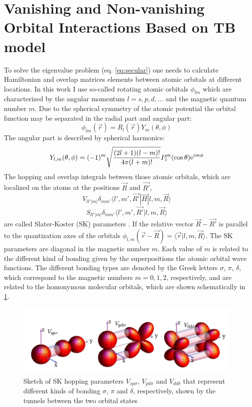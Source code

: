 \section{Vanishing and Non-vanishing Orbital Interactions Based on TB model}
To solve the eigenvalue problem (eq. \ref{eq:secular}) one needs to calculate Hamiltonian and overlap matrices elements between atomic orbitals at different locations. In this work I use so-called rotating atomic orbitals $\phi_{lm}$ which are characterized by the angular momentum $l = {s, p, d, ...}$ and the magnetic quantum number $m$. Due to the spherical symmetry of the atomic potential the orbital function may be separated in the radial part and angular part:
\begin{equation}
	\phi_{lm}(\vec{r}) = R_l(\vec{r}) Y_m(\theta, \phi)
\end{equation}
The angular part is described by spherical harmonics:
\begin{equation}
	Y_{l,m}(\theta, \phi) = (-1)^m \sqrt{\frac{(2l + 1)(l-m)!}{4 \pi (l+m)!}} P_l^m(\cos{\theta})\mathrm{e}^{i m \phi}
\end{equation}
The hopping and overlap integrals between those atomic orbitals, which are localized on the atoms at the positions $\vec{R}$ and $\vec{R'}$,
\begin{equation}
	V_{ll'|m|} \delta_{mm'}\langle l', m', \vec{R'} | \hat{H} | l, m , \vec{R} \rangle
\end{equation}
\begin{equation}
	S_{ll'|m|} \delta_{mm'}\langle l', m', \vec{R'} | l, m , \vec{R} \rangle
\end{equation}
are called Slater-Koster (SK) parameters \cite{slatter}. If the relative vector $\vec{R}-\vec{R'}$ is parallel to the quantization axes of the orbitals $\phi_{l,m}(\vec{r} - \vec{R}) = \langle \vec{r} | l, m, \vec{R} \rangle$. The SK parameters are diagonal in the magnetic number $m$. Each value of $m$ is related to the different kind of bonding given by the superpositions the atomic orbital wave functions. The different bonding types are denoted by the Greek letters $\sigma$, $\pi$, $\delta$, which correspond to the magnetic numbers $m = {0, 1, 2}$, respectively, and are related to the homonymous molecular orbitals, which are shown schematically in \ref{fig:orbitals}. 
\begin{figure}[hb]  \label{fig:orbitals}
  \includegraphics[width=\linewidth]{img/orbitals}
  \caption[caption]{Sketch of SK hopping parameters $V_{sp\sigma}$, $V_{pd\pi}$ and $V_{dd\delta}$ that represent different kinds of bonding $\sigma$, $\pi$ and $\delta$, respectively, shown by the tunnels between the two orbital states\footnotemark}
\end{figure}

